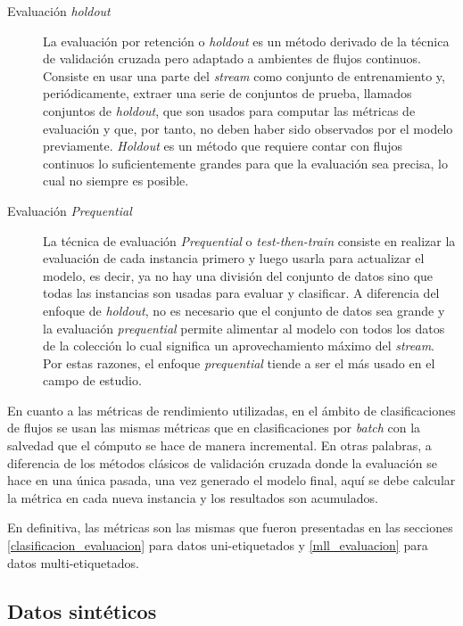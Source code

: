 \begin{description} 

   \item[Evaluación \textit{holdout}] La evaluación por retención o
      \textit{holdout} es un método derivado de la técnica de validación cruzada
      pero adaptado a ambientes de flujos continuos. Consiste en usar una parte
      del \textit{stream} como conjunto de entrenamiento y, periódicamente,
      extraer una serie de conjuntos de prueba, llamados conjuntos de
      \textit{holdout}, que son usados para computar las métricas de evaluación
      y que, por tanto, no deben haber sido observados por el modelo
      previamente.  \textit{Holdout} es un método que requiere contar con flujos
      continuos lo suficientemente grandes para que la evaluación sea precisa,
      lo cual no siempre es posible.

   \item[Evaluación \textit{Prequential}] La técnica de evaluación
      \textit{Prequential} o \textit{test-then-train} consiste en realizar la
      evaluación de cada instancia primero y luego usarla para actualizar el
      modelo, es decir, ya no hay una división del conjunto de datos sino que
      todas las instancias son usadas para evaluar y clasificar. A diferencia
      del enfoque de \textit{holdout}, no es necesario que el conjunto de datos
      sea grande y la evaluación \textit{prequential} permite alimentar al
      modelo con todos los datos de la colección lo cual significa un
      aprovechamiento máximo del \textit{stream}. Por estas razones, el enfoque
      \textit{prequential} tiende a ser el más usado en el campo de estudio.

\end{description} 

En cuanto a las métricas de rendimiento utilizadas, en el ámbito de
clasificaciones de flujos se usan las mismas métricas que en clasificaciones por
\textit{batch} con la salvedad que el cómputo se hace de manera incremental. En
otras palabras, a diferencia de los métodos clásicos de validación cruzada donde
la evaluación se hace en una única pasada, una vez generado el modelo final,
aquí se debe calcular la métrica en cada nueva instancia y los resultados son
acumulados.

En definitiva, las métricas son las mismas que fueron presentadas en las secciones
\ref{clasificacion_evaluacion} para datos uni-etiquetados y \ref{mll_evaluacion}
para datos multi-etiquetados.

\subsection{Datos sintéticos}

